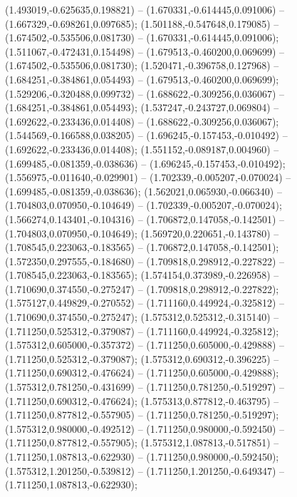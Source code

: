  (1.493019,-0.625635,0.198821) -- (1.670331,-0.614445,0.091006) -- (1.667329,-0.698261,0.097685);
 (1.501188,-0.547648,0.179085) -- (1.674502,-0.535506,0.081730) -- (1.670331,-0.614445,0.091006);
 (1.511067,-0.472431,0.154498) -- (1.679513,-0.460200,0.069699) -- (1.674502,-0.535506,0.081730);
 (1.520471,-0.396758,0.127968) -- (1.684251,-0.384861,0.054493) -- (1.679513,-0.460200,0.069699);
 (1.529206,-0.320488,0.099732) -- (1.688622,-0.309256,0.036067) -- (1.684251,-0.384861,0.054493);
 (1.537247,-0.243727,0.069804) -- (1.692622,-0.233436,0.014408) -- (1.688622,-0.309256,0.036067);
 (1.544569,-0.166588,0.038205) -- (1.696245,-0.157453,-0.010492) -- (1.692622,-0.233436,0.014408);
 (1.551152,-0.089187,0.004960) -- (1.699485,-0.081359,-0.038636) -- (1.696245,-0.157453,-0.010492);
 (1.556975,-0.011640,-0.029901) -- (1.702339,-0.005207,-0.070024) -- (1.699485,-0.081359,-0.038636);
 (1.562021,0.065930,-0.066340) -- (1.704803,0.070950,-0.104649) -- (1.702339,-0.005207,-0.070024);
 (1.566274,0.143401,-0.104316) -- (1.706872,0.147058,-0.142501) -- (1.704803,0.070950,-0.104649);
 (1.569720,0.220651,-0.143780) -- (1.708545,0.223063,-0.183565) -- (1.706872,0.147058,-0.142501);
 (1.572350,0.297555,-0.184680) -- (1.709818,0.298912,-0.227822) -- (1.708545,0.223063,-0.183565);
 (1.574154,0.373989,-0.226958) -- (1.710690,0.374550,-0.275247) -- (1.709818,0.298912,-0.227822);
 (1.575127,0.449829,-0.270552) -- (1.711160,0.449924,-0.325812) -- (1.710690,0.374550,-0.275247);
 (1.575312,0.525312,-0.315140) -- (1.711250,0.525312,-0.379087) -- (1.711160,0.449924,-0.325812);
 (1.575312,0.605000,-0.357372) -- (1.711250,0.605000,-0.429888) -- (1.711250,0.525312,-0.379087);
 (1.575312,0.690312,-0.396225) -- (1.711250,0.690312,-0.476624) -- (1.711250,0.605000,-0.429888);
 (1.575312,0.781250,-0.431699) -- (1.711250,0.781250,-0.519297) -- (1.711250,0.690312,-0.476624);
 (1.575313,0.877812,-0.463795) -- (1.711250,0.877812,-0.557905) -- (1.711250,0.781250,-0.519297);
 (1.575312,0.980000,-0.492512) -- (1.711250,0.980000,-0.592450) -- (1.711250,0.877812,-0.557905);
 (1.575312,1.087813,-0.517851) -- (1.711250,1.087813,-0.622930) -- (1.711250,0.980000,-0.592450);
 (1.575312,1.201250,-0.539812) -- (1.711250,1.201250,-0.649347) -- (1.711250,1.087813,-0.622930);
